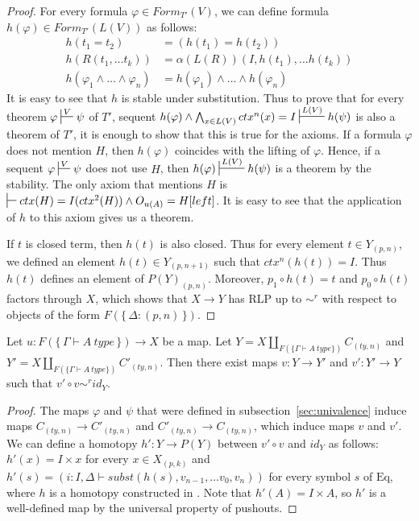 \documentclass[reqno]{amsart}
\theoremstyle{definition}
\theoremstyle{remark}
\newcommand{\Eq}{\mathrm{Eq}}
\newcommand{\type}{type}
\numberwithin{figure}{section}
\begin{document}
\begin{proof}
For every formula $\varphi \in Form_{T'}(V)$, we can define formula $h(\varphi) \in Form_{T'}(L(V))$ as follows:
\begin{align*}
h(t_1 = t_2) & = (h(t_1) = h(t_2)) \\
h(R(t_1, \ldots t_k)) & = \alpha(L(R))(I, h(t_1), \ldots h(t_k)) \\
h(\varphi_1 \land \ldots \land \varphi_n) & = h(\varphi_1) \land \ldots \land h(\varphi_n)
\end{align*}
It is easy to see that $h$ is stable under substitution.
Thus to prove that for every theorem $\varphi \sststile{}{V} \psi$ of $T'$, sequent $h(\varphi) \land \bigwedge_{x \in L(V)} ctx^n(x) = I \sststile{}{L(V)} h(\psi)$
is also a theorem of $T'$, it is enough to show that this is true for the axioms.
If a formula $\varphi$ does not mention $H$, then $h(\varphi)$ coincides with the lifting of $\varphi$.
Hence, if a sequent $\varphi \sststile{}{V} \psi$ does not use $H$, then $h(\varphi) \sststile{}{L(V)} h(\psi)$ is a theorem by the stability.
The only axiom that mentions $H$ is $\sststile{}{} ctx(H) = I(ctx^2(H)) \land O_{u(A)} = H[left]$.
It is easy to see that the application of $h$ to this axiom gives us a theorem.

If $t$ is closed term, then $h(t)$ is also closed.
Thus for every element $t \in Y_{(p,n)}$, we defined an element $h(t) \in Y_{(p,n+1)}$ such that $ctx^n(h(t)) = I$.
Thus $h(t)$ defines an element of $P(Y)_{(p,n)}$.
Moreover, $p_1 \circ h(t) = t$ and $p_0 \circ h(t)$ factors through $X$,
which shows that $X \to Y$ has RLP up to $\sim^r$ with respect to objects of the form $F(\{\,\Delta : (p,n)\,\})$.
\end{proof}

\begin{lem}[Jhom]
Let $u : F(\{\,\Gamma \vdash A\ \type\,\}) \to X$ be a map.
Let $Y = X \amalg_{F(\{ \Gamma \vdash A\ \type \})} C_{(ty,n)}$ and $Y' = X \amalg_{F(\{ \Gamma \vdash A\ \type \})} C'_{(ty,n)}$.
Then there exist maps $v : Y \to Y'$ and $v' : Y' \to Y$ such that $v' \circ v \sim^r id_Y$.
\end{lem}
\begin{proof}
The maps $\varphi$ and $\psi$ that were defined in subsection~\ref{sec:univalence} induce maps $C_{(ty,n)} \to C'_{(ty,n)}$ and $C'_{(ty,n)} \to C_{(ty,n)}$, which induce maps $v$ and $v'$.
We can define a homotopy $h' : Y \to P(Y)$ between $v' \circ v$ and $id_Y$ as follows: $h'(x) = I \times x$ for every $x \in X_{(p,k)}$
and $h'(s) = (i : I, \Delta \vdash subst(h(s), v_{n-1}, \ldots v_0, v_n))$ for every symbol $s$ of $\Eq$,
where $h$ is a homotopy constructed in .
Note that $h'(A) = I \times A$, so $h'$ is a well-defined map by the universal property of pushouts.
\end{proof}
\end{document}
